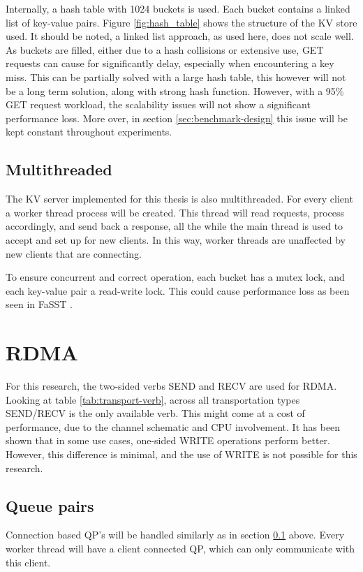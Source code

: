 Internally, a hash table with 1024 buckets is used.
Each bucket contains a linked list of key-value pairs.
Figure \ref{fig:hash_table} shows the structure of the KV store used.
It should be noted, a linked list approach, as used here, does not scale well.
As buckets are filled, either due to a hash collisions or extensive use, GET requests can cause for significantly delay, especially when encountering a key miss.
This can be partially solved with a large hash table, this however will not be a long term solution, along with strong hash function.
However, with a 95\% GET request workload, the scalability issues will not show a significant performance loss.
More over, in section \ref{sec:benchmark-design} this issue will be kept constant throughout experiments.

\subsection{Multithreaded}\label{subsec:multithreaded}
The KV server implemented for this thesis is also multithreaded.
For every client a worker thread process will be created.
This thread will read requests, process accordingly, and send back a response, all the while the main thread is used to accept and set up for new clients.
In this way, worker threads are unaffected by new clients that are connecting.

To ensure concurrent and correct operation, each bucket has a mutex lock, and each key-value pair a read-write lock.
This could cause performance loss as been seen in FaSST \cite{kalia2016fasst, qiu2018toward}.

\section{RDMA}\label{sec:rdma2}
For this research, the two-sided verbs SEND and RECV are used for RDMA.
Looking at table \ref{tab:transport-verb}, across all transportation types SEND/RECV is the only available verb.
This might come at a cost of performance, due to the channel schematic and CPU involvement.
It has been shown that in some use cases, one-sided WRITE operations perform better\cite{kalia2014using}.
However, this difference is minimal, and the use of WRITE is not possible for this research.

\subsection{Queue pairs}
Connection based QP's will be handled similarly as in section \ref{subsec:multithreaded} above.
Every worker thread will have a client connected QP, which can only communicate with this client.

